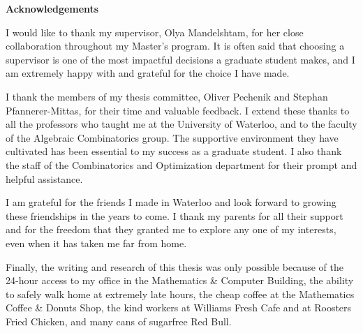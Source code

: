 {\large
{}
\begin{center}\textbf{Acknowledgements}\end{center}


I would like to thank my supervisor, Olya Mandelshtam, for her close collaboration throughout my Master's program.
It is often said that choosing a supervisor is one of the most impactful decisions a graduate student makes,
and I am extremely happy with and grateful for the choice I have made.

I thank the members of my thesis committee, Oliver Pechenik and Stephan Pfannerer-Mittas, for their time and valuable feedback.
I extend these thanks to all the professors who taught me at the University of Waterloo,
and to the faculty of the Algebraic Combinatorics group.
The supportive environment they have cultivated has been essential to my success as a graduate student.
I also thank the staff of the Combinatorics and Optimization department for their prompt and helpful assistance.

I am grateful for the friends I made in Waterloo and look forward to growing these friendships in the years to come.
I thank my parents for all their support and for the freedom that they granted me to explore any one of my interests, even when it has taken me far from home.

Finally, the writing and research of this thesis was only possible because of
the 24-hour access to my office in the Mathematics \& Computer Building, 
the ability to safely walk home at extremely late hours,
the cheap coffee at the Mathematics Coffee \& Donuts Shop,
the kind workers at Williams Fresh Cafe and at Roosters Fried Chicken,
and many cans of sugarfree Red Bull.

}

\clearpage
{}

\renewcommand\contentsname{Table of Contents}
\tableofcontents
\cleardoublepage
{}

